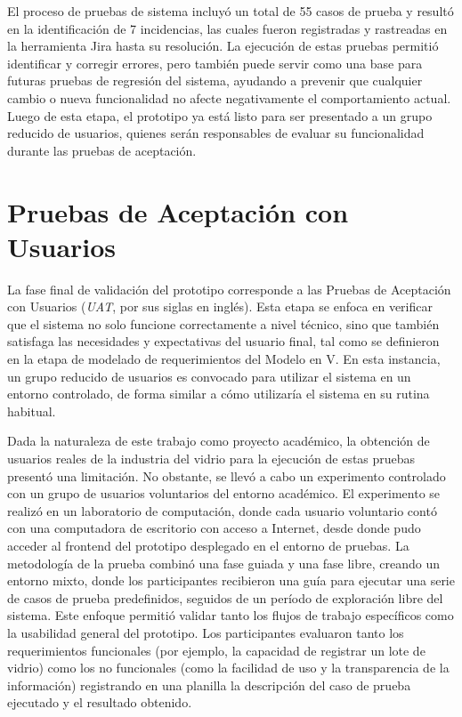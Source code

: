El proceso de pruebas de sistema incluyó un total de 55 casos de prueba y resultó en la identificación de 7 incidencias, las cuales fueron registradas y rastreadas en la herramienta Jira hasta su resolución. La ejecución de estas pruebas permitió identificar y corregir errores, pero también puede servir como una base para futuras pruebas de regresión del sistema, ayudando a prevenir que cualquier cambio o nueva funcionalidad no afecte negativamente el comportamiento actual. Luego de esta etapa, el prototipo ya está listo para ser presentado a un grupo reducido de usuarios, quienes serán responsables de evaluar su funcionalidad durante las pruebas de aceptación.

\section{Pruebas de Aceptación con Usuarios}
\label{sec:user-acceptance-testing}

La fase final de validación del prototipo corresponde a las Pruebas de Aceptación con Usuarios (\textit{UAT}, por sus siglas en inglés). Esta etapa se enfoca en verificar que el sistema no solo funcione correctamente a nivel técnico, sino que también satisfaga las necesidades y expectativas del usuario final, tal como se definieron en la etapa de modelado de requerimientos del Modelo en V. En esta instancia, un grupo reducido de usuarios es convocado para utilizar el sistema en un entorno controlado, de forma similar a cómo utilizaría el sistema en su rutina habitual. 

Dada la naturaleza de este trabajo como proyecto académico, la obtención de usuarios reales de la industria del vidrio para la ejecución de estas pruebas presentó una limitación. No obstante, se llevó a cabo un experimento controlado con un grupo de usuarios voluntarios del entorno académico. El experimento se realizó en un laboratorio de computación, donde cada usuario voluntario contó con una computadora de escritorio con acceso a Internet, desde donde pudo acceder al frontend del prototipo desplegado en el entorno de pruebas. La metodología de la prueba combinó una fase guiada y una fase libre, creando un entorno mixto, donde los participantes recibieron una guía para ejecutar una serie de casos de prueba predefinidos, seguidos de un período de exploración libre del sistema. Este enfoque permitió validar tanto los flujos de trabajo específicos como la usabilidad general del prototipo. Los participantes evaluaron tanto los requerimientos funcionales (por ejemplo, la capacidad de registrar un lote de vidrio) como los no funcionales (como la facilidad de uso y la transparencia de la información) registrando en una planilla la descripción del caso de prueba ejecutado y el resultado obtenido.

